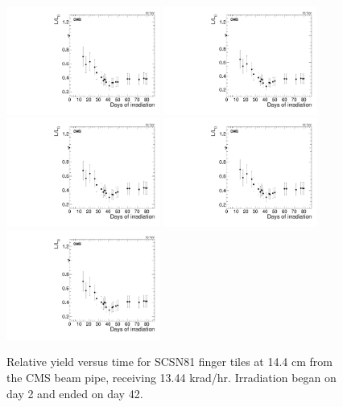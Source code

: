 \begin{figure}[tbp!]
\centering
\includegraphics[width=0.45\textwidth]{figures/SCSN81-F-14p4cm-f4ch3-time.pdf}
\includegraphics[width=0.45\textwidth]{figures/SCSN81-F-14p4cm-f7ch0-time.pdf}
\includegraphics[width=0.45\textwidth]{figures/SCSN81-F-14p4cm-f18ch0-time.pdf}
\includegraphics[width=0.45\textwidth]{figures/SCSN81-F-14p4cm-f18ch1-time.pdf}
\includegraphics[width=0.45\textwidth]{figures/SCSN81-F-14p4cm-f18ch2-time.pdf}
\caption{Relative yield versus time for SCSN81 finger tiles at 14.4 cm from the CMS beam pipe, receiving 13.44 krad/hr. Irradiation began on day 2 and ended on day 42.}
\label{fig:SCSN81-F-14p4cm-time}
\end{figure} 

